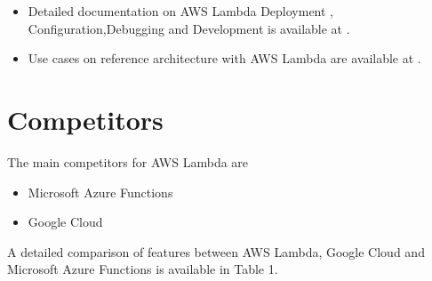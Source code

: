 \documentclass[9pt,twocolumn,twoside]{styles/osajnl}
\begin{document}
\begin{itemize}
\renewcommand{\labelitemi}{\scriptsize$\bullet$} 
\item Detailed documentation on AWS Lambda  Deployment , Configuration,Debugging and Development is available at \cite{www-AWSLambdaDoc}.
\item Use cases on reference architecture with  AWS Lambda are available at \cite{www-AWSLambdaUseCase}. 
\end{itemize}

\section{Competitors}

The main competitors for AWS Lambda are
\begin{itemize}
\renewcommand{\labelitemi}{\scriptsize$\bullet$} 
\item Microsoft Azure Functions
\item Google Cloud
\end{itemize}

A detailed comparison of features between AWS Lambda, Google Cloud and Microsoft Azure Functions is available in Table 1.
\end{document}

